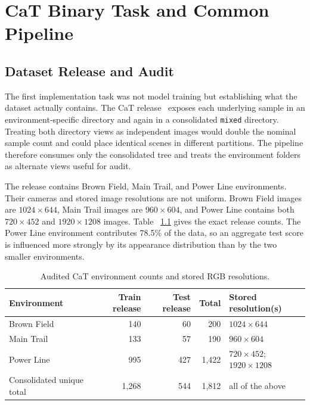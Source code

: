 \chapter{CaT Binary Task and Common Pipeline}
\label{ch:cat_pipeline}

\section{Dataset Release and Audit}

The first implementation task was not model training but establishing what the
dataset actually contains. The CaT release~\cite{sharma2022cat} exposes each underlying sample in
an environment-specific directory and again in a consolidated
\texttt{mixed} directory. Treating both directory views as independent images
would double the nominal sample count and could place identical scenes in
different partitions. The pipeline therefore consumes only the consolidated
tree and treats the environment folders as alternate views useful for audit.

The release contains Brown Field, Main Trail, and Power Line environments.
Their cameras and stored image resolutions are not uniform. Brown Field images
are $1024\times644$, Main Trail images are $960\times604$, and Power Line
contains both $720\times452$ and $1920\times1208$ images. Table
~\ref{tab:cat_environment_counts} gives the exact release counts. The
Power Line environment contributes 78.5\% of the data, so an aggregate test
score is influenced more strongly by its appearance distribution than by the
two smaller environments.

\begin{table}[H]
\centering
\caption{Audited CaT environment counts and stored RGB resolutions.}
\label{tab:cat_environment_counts}
\small
\begin{tabularx}{\textwidth}{@{}lrrrX@{}}
\toprule
\textbf{Environment} & \textbf{Train release} & \textbf{Test release} & \textbf{Total} & \textbf{Stored resolution(s)} \\
\midrule
Brown Field & 140 & 60 & 200 & $1024\times644$ \\
Main Trail & 133 & 57 & 190 & $960\times604$ \\
Power Line & 995 & 427 & 1,422 & $720\times452$; $1920\times1208$ \\
\midrule
Consolidated unique total & 1,268 & 544 & 1,812 & all of the above \\
\bottomrule
\end{tabularx}
\end{table}

